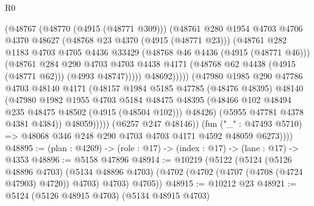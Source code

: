 \begin{lexlean}{R0}
\begin{coremodule}
                              (@48767
                                (@48770 (@4915 (@48771 @309)))
                                (@48761
                                  @280
                                  @1954
                                  @4703
                                  @4706
                                  @4370
                                  @48627
                                  (@48768 @23 @4370 (@4915 (@48771 @23)))
                                  (@48761
                                    @282
                                    @1183
                                    @4703
                                    @4705
                                    @4436
                                    @33429
                                    (@48768 @46 @4436 (@4915 (@48771 @46)))
                                    (@48761
                                      @284
                                      @290
                                      @4703
                                      @4703
                                      @4438
                                      @4171
                                      (@48768 @62 @4438 (@4915 (@48771 @62)))
                                      (@4993 @48747)))))
                              @48692)))))
                    (@47980
                      @1985
                      @290
                      @47786
                      @4703
                      @48140
                      @4171
                      (@48157
                        @1984
                        @5185
                        @47785
                        (@48476 @48395)
                        @48140
                        (@47980
                          @1982
                          @1955
                          @4703
                          @5184
                          @48475
                          @48395
                          (@48466 @102 @48494 @235 @48475 @48502 (@4915 (@48504 @102)))
                          @48426)
                        (@5955 @47781 @4378 @4381 @4384))
                      @48059)))))
            (@6257 @247 @48146))
          (fun ("_" : @47493 @5710) =>
          @48068 @346 @248 @290 @4703 @4703 @4171 @4592 @48059 @6273))))
@48895 := (plan : @4269) -> (role : @17) -> (index : @17) -> (lane : @17) -> @4353
@48896 := @5158 @47896
@48914 := @10219
    (@5122
      (@5124
        (@5126 @48896 @4703)
        (@5134 @48896 @4703)
        (@4702 (@4702 (@4707 (@4708 (@4724 @47903) @4720)) @4703) @4703)
        @4705))
@48915 := @10212 @23
@48921 := @5124 (@5126 @48915 @4703) (@5134 @48915 @4703)

\end{coremodule}
\end{lexlean}
